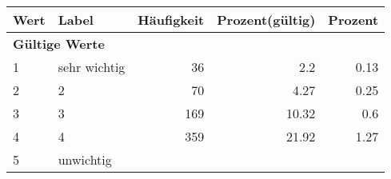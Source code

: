      \begin{longtable}{lXrrr}
     \toprule
     \textbf{Wert} & \textbf{Label} & \textbf{Häufigkeit} & \textbf{Prozent(gültig)} & \textbf{Prozent} \\
     \endhead
     \midrule
     \multicolumn{5}{l}{\textbf{Gültige Werte}}\\

     1 &
     \multicolumn{1}{X}{ sehr wichtig   } &


       \num{36} &
       \num[round-mode=places,round-precision=2]{2,2} &
         \num[round-mode=places,round-precision=2]{0,13} \\

     2 &
     \multicolumn{1}{X}{ 2   } &


       \num{70} &
       \num[round-mode=places,round-precision=2]{4,27} &
         \num[round-mode=places,round-precision=2]{0,25} \\

     3 &
     \multicolumn{1}{X}{ 3   } &


       \num{169} &
       \num[round-mode=places,round-precision=2]{10,32} &
         \num[round-mode=places,round-precision=2]{0,6} \\

     4 &
     \multicolumn{1}{X}{ 4   } &


       \num{359} &
       \num[round-mode=places,round-precision=2]{21,92} &
         \num[round-mode=places,round-precision=2]{1,27} \\

     5 &
     \multicolumn{1}{X}{ unwichtig   } &



\end{longtable}
